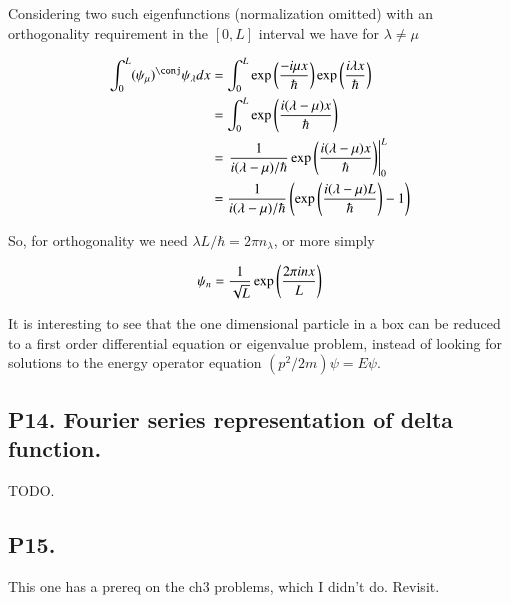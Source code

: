 \documentclass{article}
\begin{document}
Considering two such eigenfunctions (normalization omitted) with an orthogonality requirement in the $[0,L]$ interval we have for $\lambda \ne \mu$

\begin{align*}
\int_0^L (\psi_\mu)^\conj \psi_\lambda dx 
&=
\int_0^L 
\exp\left( \frac{-i \mu x }{\hbar} \right) \exp\left( \frac{i \lambda x }{\hbar} \right) \\
&=
\int_0^L \exp\left( \frac{i (\lambda -\mu) x }{\hbar} \right) \\
&=
\left. \inv{ i (\lambda -\mu)/\hbar} \exp\left( \frac{i (\lambda -\mu) x }{\hbar} \right) \right\vert_{0}^L
 \\
&=
\inv{ i (\lambda -\mu)/\hbar} \left( \exp\left( \frac{i (\lambda -\mu) L }{\hbar} \right) - 1 \right)
 \\
\end{align*}

So, for orthogonality we need $\lambda L/\hbar = 2\pi n_\lambda$, or more simply

\begin{align*}
\psi_n = \frac{1}{\sqrt{L}} \exp\left( \frac{ 2 \pi i n x }{L } \right) \\
\end{align*}

It is interesting to see that the one dimensional particle in a box can be reduced to a first order differential equation or 
eigenvalue problem, instead of looking for solutions to the energy operator equation $(p^2/2m) \psi = E \psi$.

\subsection{P14. Fourier series representation of delta function. }

TODO.

\subsection{P15. }

This one has a prereq on the ch3 problems, which I didn't do.  Revisit.



\end{document}
